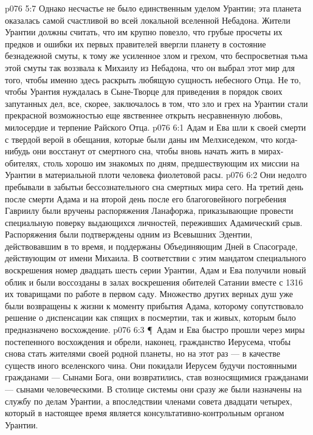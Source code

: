 \vs p076 5:7 Однако несчастье не было единственным уделом Урантии; эта планета оказалась самой счастливой во всей локальной вселенной Небадона. Жители Урантии должны считать, что им крупно повезло, что грубые просчеты их предков и ошибки их первых правителей ввергли планету в состояние безнадежной смуты, к тому же усиленное злом и грехом, что беспросветная тьма этой смуты так воззвала к Михаилу из Небадона, что он выбрал этот мир для того, чтобы именно здесь раскрыть любящую сущность небесного Отца. Не то, чтобы Урантия нуждалась в Сыне\hyp{}Творце для приведения в порядок своих запутанных дел, все, скорее, заключалось в том, что зло и грех на Урантии стали прекрасной возможностью еще явственнее открыть несравненную любовь, милосердие и терпение Райского Отца.
\vs p076 6:1 Адам и Ева шли к своей смерти с твердой верой в обещания, которые были даны им Мелхиседеком, что когда\hyp{}нибудь они восстанут от смертного сна, чтобы вновь начать жить в мирах\hyp{}обителях, столь хорошо им знакомых по дням, предшествующим их миссии на Урантии в материальной плоти человека фиолетовой расы.
\vs p076 6:2 Они недолго пребывали в забытьи бессознательного сна смертных мира сего. На третий день после смерти Адама и на второй день после его благоговейного погребения Гавриилу были вручены распоряжения Ланафоржа, приказывающие провести специальную поверку выдающихся личностей, переживших Адамический срыв. Распоряжения были подтверждены одним из Всевышних Эдентии, действовавшим в то время, и поддержаны Объединяющим Дней в Спасограде, действующим от имени Михаила. В соответствии с этим мандатом специального воскрешения номер двадцать шесть серии Урантии, Адам и Ева получили новый облик и были воссозданы в залах воскрешения обителей Сатании вместе с 1316 их товарищами по работе в первом саду. Множество других верных душ уже были возвращены к жизни к моменту прибытия Адама, которому сопутствовало решение о диспенсации как спящих в посмертии, так и живых, которым было предназначено восхождение.
\vs p076 6:3 \P\ Адам и Ева быстро прошли через миры постепенного восхождения и обрели, наконец, гражданство Иерусема, чтобы снова стать жителями своей родной планеты, но на этот раз --- в качестве существ иного вселенского чина. Они покидали Иерусем будучи постоянными гражданами --- Сынами Бога, они возвратились, став возносящимися гражданами --- сынами человеческими. В столице системы они сразу же были назначены на службу по делам Урантии, а впоследствии членами совета двадцати четырех, который в настоящее время является консультативно\hyp{}контрольным органом Урантии.
